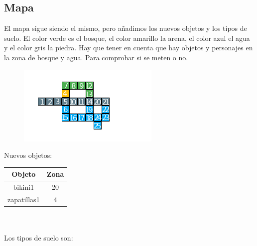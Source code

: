 \documentclass[12pt,a4paper]{article}
\begin{document}
\subsection{Mapa}
El mapa sigue siendo el mismo, pero añadimos los nuevos objetos y los tipos de suelo. El color verde es el bosque, el color amarillo la arena, el color azul el agua y el color gris la piedra. Hay que tener en cuenta que hay objetos y personajes en la zona de bosque y agua. Para comprobar si se meten o no. 
\begin{figure}[H]
	\centering
	\includegraphics{images/mapaPintadoNumeros}
	\caption{}
	\label{fig:mapa}
\end{figure}
Nuevos objetos:\\
\begin{tabular}{|c|c|}
	\hline 
	Objeto & Zona \\ 
	\hline 
	bikini1 & 20 \\ 
	\hline 
	zapatillas1 & 4 \\ 
	\hline 
\end{tabular}\\\\
Los tipos de suelo son:\\
\end{document}

